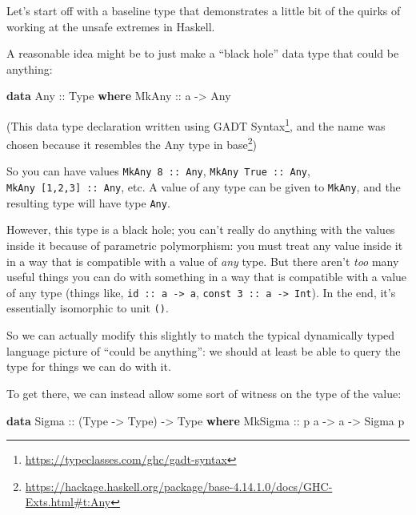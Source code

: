 \documentclass[]{article}
\newenvironment{Shaded}{}{}
\newcommand{\DataTypeTok}[1]{\textcolor[rgb]{0.56,0.13,0.00}{#1}}
\newcommand{\KeywordTok}[1]{\textcolor[rgb]{0.00,0.44,0.13}{\textbf{#1}}}
\newcommand{\NormalTok}[1]{#1}
\newcommand{\OtherTok}[1]{\textcolor[rgb]{0.00,0.44,0.13}{#1}}
\renewcommand{\href}[2]{#2\footnote{\url{#1}}}
\begin{document}
Let's start off with a baseline type that demonstrates a little bit of the
quirks of working at the unsafe extremes in Haskell.

A reasonable idea might be to just make a ``black hole'' data type that could be
anything:

\begin{Shaded}
\begin{Highlighting}[]
\KeywordTok{data} \DataTypeTok{Any}\OtherTok{ ::} \DataTypeTok{Type} \KeywordTok{where}
  \DataTypeTok{MkAny}\OtherTok{ ::}\NormalTok{ a }\OtherTok{{-}\textgreater{}} \DataTypeTok{Any}
\end{Highlighting}
\end{Shaded}

(This data type declaration written using
\href{https://typeclasses.com/ghc/gadt-syntax}{GADT Syntax}, and the name was
chosen because it resembles
\href{https://hackage.haskell.org/package/base-4.14.1.0/docs/GHC-Exts.html\#t:Any}{the
Any type in base})

So you can have values \texttt{MkAny\ 8\ ::\ Any},
\texttt{MkAny\ True\ ::\ Any}, \texttt{MkAny\ {[}1,2,3{]}\ ::\ Any}, etc. A
value of any type can be given to \texttt{MkAny}, and the resulting type will
have type \texttt{Any}.

However, this type is a black hole; you can't really do anything with the values
inside it because of parametric polymorphism: you must treat any value inside it
in a way that is compatible with a value of \emph{any} type. But there aren't
\emph{too} many useful things you can do with something in a way that is
compatible with a value of any type (things like,
\texttt{id\ ::\ a\ -\textgreater{}\ a},
\texttt{const\ 3\ ::\ a\ -\textgreater{}\ Int}). In the end, it's essentially
isomorphic to unit \texttt{()}.

So we can actually modify this slightly to match the typical dynamically typed
language picture of ``could be anything'': we should at least be able to query
the type for things we can do with it.

To get there, we can instead allow some sort of witness on the type of the
value:

\begin{Shaded}
\begin{Highlighting}[]
\KeywordTok{data} \DataTypeTok{Sigma}\OtherTok{ ::}\NormalTok{ (}\DataTypeTok{Type} \OtherTok{{-}\textgreater{}} \DataTypeTok{Type}\NormalTok{) }\OtherTok{{-}\textgreater{}} \DataTypeTok{Type} \KeywordTok{where}
    \DataTypeTok{MkSigma}\OtherTok{ ::}\NormalTok{ p a }\OtherTok{{-}\textgreater{}}\NormalTok{ a }\OtherTok{{-}\textgreater{}} \DataTypeTok{Sigma}\NormalTok{ p}
\end{Highlighting}
\end{Shaded}
\end{document}

